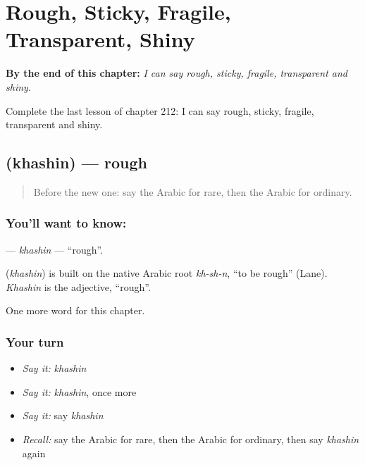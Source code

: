 
\chapter{Rough, Sticky, Fragile, Transparent, Shiny}
\label{ch:ar-rough-sticky-fragile-transparent-shiny}

\begin{chapteropening}
\textbf{By the end of this chapter:} \emph{I can say rough, sticky, fragile, transparent and shiny.}

Complete the last lesson of chapter 212: I can say rough, sticky, fragile, transparent and shiny.
\end{chapteropening}

\section[\texorpdfstring{\ar{خشن} (khashin)}{خشن (khashin)}]{ (khashin) — rough}

\label{lesson:AR-C212-khashin}



\begin{quote}
Before the new one: say the Arabic for rare, then the Arabic for ordinary.
\end{quote}

\subsection*{You'll want to know: }
\textbf{} — \emph{khashin} — \textquotedblleft{}rough\textquotedblright{}.

\begin{cousinweb}
\textbf{} (\emph{khashin}) is built on the native Arabic root \emph{kh-sh-n}, \textquotedblleft{}to be rough\textquotedblright{} (Lane). \emph{Khashin} is the adjective, \textquotedblleft{}rough\textquotedblright{}.
\end{cousinweb}

\begin{grammarlens}[title={What you've built}]
One more word for this chapter.
\end{grammarlens}

\subsection*{Your turn}
\begin{itemize}
\raggedright
  \item \emph{Say it:} \emph{khashin}
  \item \emph{Say it:} \emph{khashin}, once more
  \item \emph{Say it:} say \emph{khashin}
  \item \emph{Recall:} say the Arabic for rare, then the Arabic for ordinary, then say \emph{khashin} again
\end{itemize}

